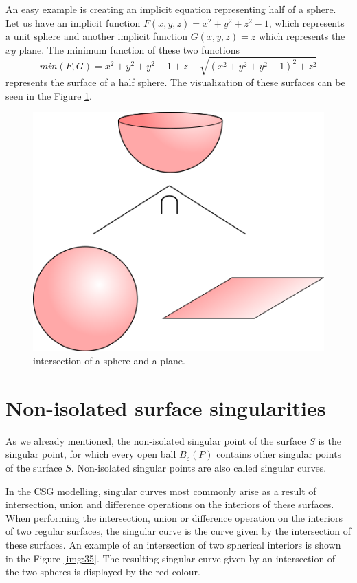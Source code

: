 An easy example is creating an implicit equation representing half of
a sphere. Let us have an implicit function 
$F(x, y, z) = x^2+y^2+z^2-1$, which represents a unit sphere and another
implicit function $G(x, y, z) = z$ which represents the $xy$ plane.
The minimum function of these two functions
$$min(F, G) = x^2+y^2+y^2-1+z-\sqrt{(x^2+y^2+y^2-1)^2+z^2}$$ represents the
surface of a half sphere. The visualization of these surfaces can be seen in
the Figure \ref{img:20}.
\begin{figure}
    \centerline{\includegraphics[scale=0.5]{images/img20}}
    \caption[Intersection of a sphere and a plane]
    {intersection of a sphere and a plane.}
    \label{img:20}
\end{figure}


\section{Non-isolated surface singularities}
\label{sub2.3}

As we already mentioned, the non-isolated singular point of the surface $S$ is 
the singular point, for which
every open ball $B_\varepsilon(P)$ contains other singular points of the surface $S$.
Non-isolated singular points are also called singular curves.

In the CSG modelling, singular curves most commonly arise as a result of intersection,
union and difference operations on the interiors of these surfaces. When performing
the intersection, union or difference operation on the interiors of two regular surfaces, 
the singular curve is the curve given by the intersection of these surfaces. An example
of an intersection of two spherical interiors is shown in the Figure \ref{img:35}. The resulting singular curve given by an intersection of the two spheres is displayed
by the red colour.


